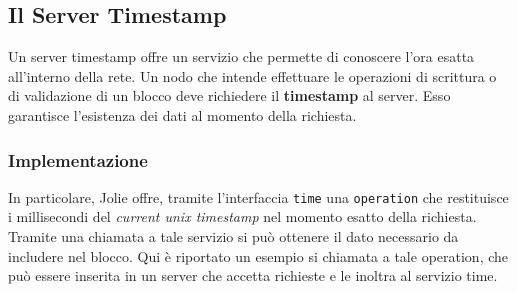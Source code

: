 \subsection{Il Server Timestamp}
Un server timestamp offre un servizio che permette di conoscere l'ora esatta all'interno della rete. Un nodo che intende effettuare le operazioni di scrittura o di validazione di un blocco deve richiedere il \textbf{timestamp} al server. Esso garantisce l'esistenza dei dati al momento della richiesta.

\subsubsection{Implementazione}
In particolare, Jolie offre, tramite l'interfaccia \texttt{time} una \texttt{operation} che restituisce i millisecondi del \textit{current unix timestamp} nel momento esatto della richiesta. Tramite una chiamata a tale servizio si può ottenere il dato necessario da includere nel blocco. Qui è riportato un esempio si chiamata a tale operation, che può essere inserita in un server che accetta richieste e le inoltra al servizio time.
%

%

